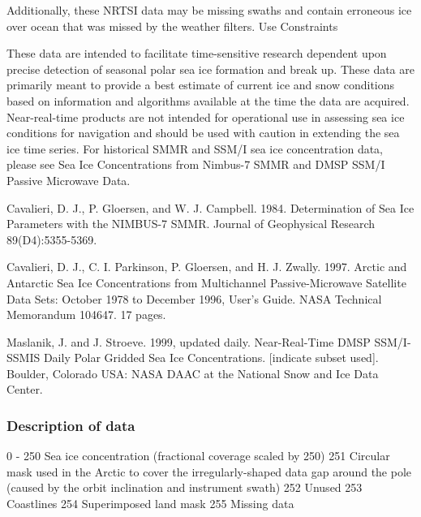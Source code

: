 Additionally, these NRTSI data may be missing swaths and contain erroneous ice over ocean that was missed by the weather filters.
Use Constraints

These data are intended to facilitate time-sensitive research dependent upon precise detection of seasonal polar sea ice formation and break up. These data are primarily meant to provide a best estimate of current ice and snow conditions based on information and algorithms available at the time the data are acquired. Near-real-time products are not intended for operational use in assessing sea ice conditions for navigation and should be used with caution in extending the sea ice time series. For historical SMMR and SSM/I sea ice concentration data, please see Sea Ice Concentrations from Nimbus-7 SMMR and DMSP SSM/I Passive Microwave Data.


Cavalieri, D. J., P. Gloersen, and W. J. Campbell. 1984. Determination of Sea Ice Parameters with the NIMBUS-7 SMMR. Journal of Geophysical Research 89(D4):5355-5369.

Cavalieri, D. J., C. I. Parkinson, P. Gloersen, and H. J. Zwally. 1997. Arctic and Antarctic Sea Ice Concentrations from Multichannel Passive-Microwave Satellite Data Sets: October 1978 to December 1996, User's Guide. NASA Technical Memorandum 104647. 17 pages.


Maslanik, J. and J. Stroeve. 1999, updated daily. Near-Real-Time DMSP SSM/I-SSMIS Daily Polar Gridded Sea Ice Concentrations. [indicate subset used]. Boulder, Colorado USA: NASA DAAC at the National Snow and Ice Data Center. 

\subsubsection{Description of data}

0 - 250 	Sea ice concentration (fractional coverage scaled by 250)
251 	Circular mask used in the Arctic to cover the irregularly-shaped data gap around the pole (caused by the orbit inclination and instrument swath)
252 	Unused
253 	Coastlines
254 	Superimposed land mask
255 	Missing data 
